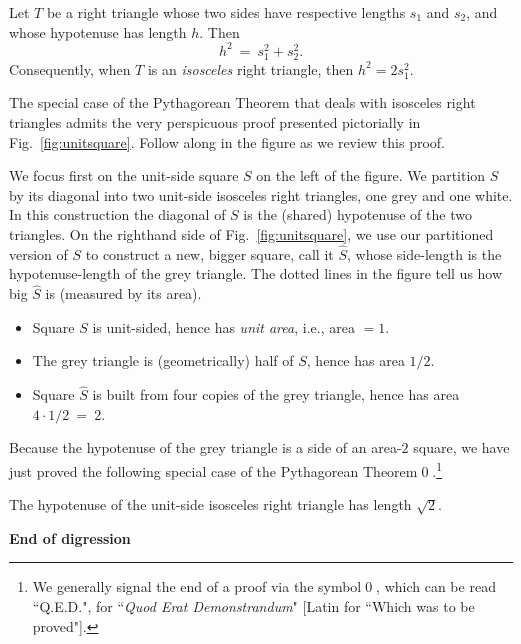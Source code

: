 \begin{theorem}
\label{thm:Pythagorean-thm}
Let $T$ be a right triangle whose two sides have respective lengths $s_1$ and $s_2$, and whose hypotenuse has length $h$.  Then
\[ h^2 \ = \ s_1^2 + s_2^2. \]
Consequently, when $T$ is an {\em isosceles} right triangle, then $h^2 = 2 s_1^2$.
\end{theorem}

The special case of the Pythagorean Theorem that deals with isosceles right triangles admits the very perspicuous proof presented pictorially in Fig.~\ref{fig:unitsquare}.  Follow along in the figure as we review this proof.

\smallskip

We focus first on the unit-side square $S$ on the left of the figure.  We partition $S$ by its diagonal into two unit-side isosceles right triangles, one grey and one white.  In this construction the diagonal of $S$ is the (shared) hypotenuse of the two triangles.  On the righthand side of Fig.~\ref{fig:unitsquare}, we use our partitioned version of $S$ to construct a new, bigger square, call it $\widehat{S}$, whose side-length is the hypotenuse-length of the grey triangle.  The dotted lines in the figure tell us how big $\widehat{S}$ is (measured by its area).
\begin{itemize}
\item
Square $S$ is unit-sided, hence has {\em unit area}, i.e., area $=1$.
\medskip\item
The grey triangle is (geometrically) half of $S$, hence has area $1/2$.
\medskip\item
Square $\widehat{S}$ is built from four copies of the grey triangle, hence has area $4 \cdot 1/2 \ = \ 2$.
\end{itemize}
Because the hypotenuse of the grey triangle is a side of an area-$2$ square, we have just proved the following special case of the Pythagorean Theorem\qed.\footnote{We generally signal the end of a proof via the symbol\qed, which can be read ``Q.E.D.", for ``{\em Quod Erat Demonstrandum}" [Latin for ``Which was to be proved"].}

\begin{prop}
\label{thm:unit-isosceles-PythThm}
The hypotenuse of the unit-side isosceles right triangle has length $\sqrt{2}$.
\end{prop}
  
\noindent \textbf{End of digression}

\bigskip

